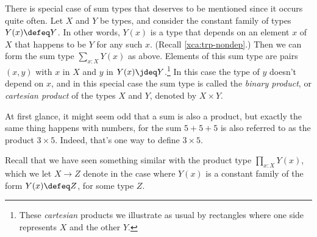 There is special case of sum types that deserves to be mentioned since
it occurs quite often. Let $X$ and $Y$ be types, and consider the constant
family of types $Y(x)\defeq Y$. In other words, $Y(x)$ is a type that depends
on an element $x$ of $X$ that happens to be $Y$ for any such $x$.
(Recall \cref{xca:trp-nondep}.)
Then we can form the sum type $\sum_{x:X} Y(x)$ as above.
Elements of this sum type are pairs $(x,y)$
with $x$ in $X$ and $y$ in $Y(x)\jdeq Y$.\footnote{%
  These \emph{cartesian} products we illustrate as usual
  by rectangles where one side represents $X$ and the other $Y$.\par
  }
In this case the type of $y$
doesn't depend on $x$, and in this special case the sum type is called
the \emph{binary product}, or \emph{cartesian product} of the types $X$ and $Y$,
denoted by $X \times Y$.

At first glance, it might seem odd that a sum is also a product, but exactly the same thing happens with numbers, for the sum $5+5+5$ is also
referred to as the product $3 \times 5$.  Indeed, that's one way to define $3 \times 5$.

Recall that we have seen something similar with the product type $\prod_{x:X} Y(x)$, which we let $X \to Z$ denote in the case where $Y(x)$ is a
constant family of the form $Y(x)\defeq Z$, for some type $Z$.

